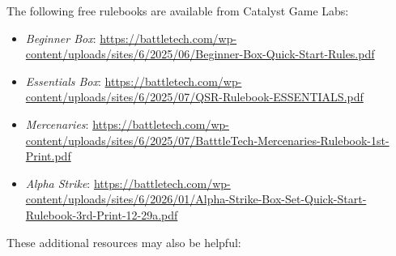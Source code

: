 The following free rulebooks are available from Catalyst Game Labs:

\begin{itemize}

   \item \emph{Beginner Box}: \href{https://battletech.com/wp-content/uploads/sites/6/2025/06/Beginner-Box-Quick-Start-Rules.pdf}{https://battletech.com/wp-content/uploads/sites/6/2025/06/Beginner-Box-Quick-Start-Rules.pdf}

    \item \emph{Essentials Box}: \href{https://battletech.com/wp-content/uploads/sites/6/2025/07/QSR-Rulebook-ESSENTIALS.pdf}{https://battletech.com/wp-content/uploads/sites/6/2025/07/QSR-Rulebook-ESSENTIALS.pdf}

    \item \emph{Mercenaries}: \href{https://battletech.com/wp-content/uploads/sites/6/2025/07/BatttleTech-Mercenaries-Rulebook-1st-Print.pdf}{https://battletech.com/wp-content/uploads/sites/6/2025/07/BatttleTech-Mercenaries-Rulebook-1st-Print.pdf}

    \item \emph{Alpha Strike}: \href{https://battletech.com/wp-content/uploads/sites/6/2026/01/Alpha-Strike-Box-Set-Quick-Start-Rulebook-3rd-Print-12-29a.pdf}{https://battletech.com/wp-content/uploads/sites/6/2026/01/Alpha-Strike-Box-Set-Quick-Start-Rulebook-3rd-Print-12-29a.pdf}

\end{itemize}

These additional resources may also be helpful:

